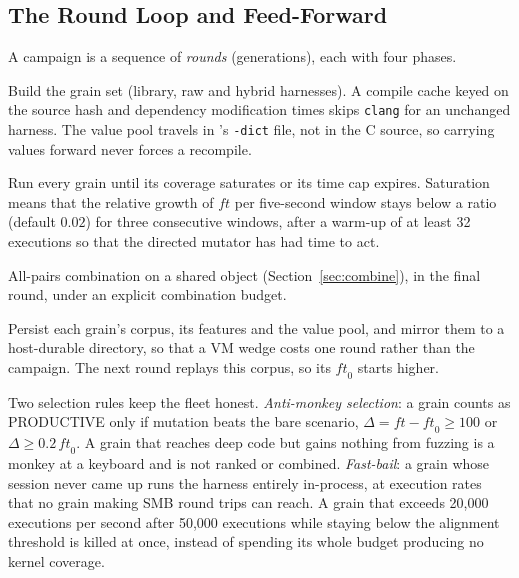 \documentclass{article}
\begin{document}
\subsection{The Round Loop and Feed-Forward}\label{sec:loop}

A campaign is a sequence of \emph{rounds} (generations), each with four
phases.
\begin{description}[nosep, font=\normalfont\bfseries]
  \item[P1 enumerate.] Build the grain set (library, raw and hybrid
        harnesses). A compile cache keyed on the source hash and dependency
        modification times skips \texttt{clang} for an unchanged harness.
        The value pool travels in \libfuzzer's \texttt{-dict} file, not in
        the C source, so carrying values forward never forces a recompile.
  \item[P2 saturate.] Run every grain until its coverage saturates or its time
        cap expires. Saturation means that the relative growth of
        $\mathit{ft}$ per five-second window stays below a ratio (default
        $0.02$) for three consecutive windows, after a warm-up of at least 32
        executions so that the directed mutator has had time to act.
  \item[P3 combine.] All-pairs combination on a shared object
        (Section~\ref{sec:combine}), in the final round, under an explicit
        combination budget.
  \item[P4 save.] Persist each grain's corpus, its features and the value
        pool, and mirror them to a host-durable directory, so that a VM
        wedge costs one round rather than the campaign. The next round
        replays this corpus, so its $\mathit{ft}_0$ starts higher.
\end{description}

Two selection rules keep the fleet honest. \emph{Anti-monkey selection}: a
grain counts as PRODUCTIVE only if mutation beats the bare scenario,
$\Delta = \mathit{ft} - \mathit{ft}_0 \geq 100$ or
$\Delta \geq 0.2\,\mathit{ft}_0$. A grain that reaches deep code but gains
nothing from fuzzing is a monkey at a keyboard and is not ranked or combined.
\emph{Fast-bail}: a grain whose session never came up runs the harness
entirely in-process, at execution rates that no grain making SMB round trips
can reach. A grain that exceeds 20{,}000 executions per second after 50{,}000
executions while staying below the alignment threshold is killed at once,
instead of spending its whole budget producing no kernel coverage.
\end{document}

